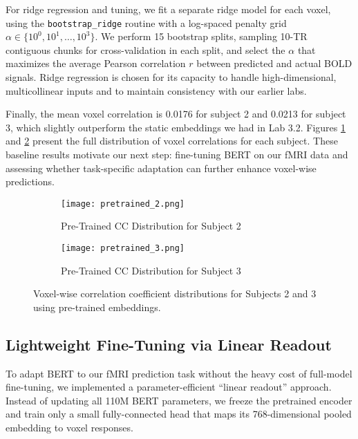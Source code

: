 \documentclass{article}
\begin{document}
For ridge regression and tuning, we fit a separate ridge model for each voxel, using the \texttt{bootstrap\_ridge} routine with 
a log-spaced penalty grid $\alpha \in \{10^0, 10^1, \ldots, 10^3\}$. We perform 15 bootstrap splits, sampling 10-TR contiguous chunks for cross-validation in each split, and select the $\alpha$ that maximizes the average Pearson correlation $r$ between predicted and actual BOLD signals. Ridge regression is chosen for its capacity to handle high-dimensional, multicollinear inputs and to maintain consistency with our earlier labs.

Finally, the mean voxel correlation is 0.0176 for subject 2 and 0.0213 for subject 3, which slightly outperform the static embeddings we had in Lab 3.2. Figures \ref{fig:pretrained_cc_2} and \ref{fig:pretrained_cc_3} present the full distribution of voxel correlations for each subject. These baseline results motivate our next step: fine-tuning BERT on our fMRI data and assessing whether task-specific adaptation can further enhance voxel-wise predictions.

\begin{figure}[htbp]
\centering
\begin{subfigure}[b]{0.45\linewidth}
    \centering
    \texttt{[image: pretrained\_2.png]}
    \caption{Pre-Trained CC Distribution for Subject 2}
    \label{fig:pretrained_cc_2}
\end{subfigure}
\hfill
\begin{subfigure}[b]{0.45\linewidth}
    \centering
    \texttt{[image: pretrained\_3.png]}
    \caption{Pre-Trained CC Distribution for Subject 3}
    \label{fig:pretrained_cc_3}
\end{subfigure}
\caption{Voxel-wise correlation coefficient distributions for Subjects 2 and 3 using pre-trained embeddings.}
\label{fig:pretrained_ccs}
\end{figure}

\subsection{Lightweight Fine-Tuning via Linear Readout}

To adapt BERT to our fMRI prediction task without the heavy cost of full-model fine-tuning, we implemented a parameter-efficient “linear readout” approach. Instead of updating all 110M BERT parameters, we freeze the pretrained encoder and train only a small fully-connected head that maps its 768-dimensional pooled embedding to voxel responses.
\end{document}
